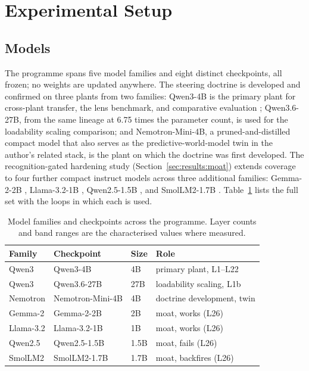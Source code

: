 \section{Experimental Setup}
\label{sec:setup}

\subsection{Models}

The programme spans five model families and eight distinct checkpoints, all frozen; no weights are updated anywhere. The steering doctrine is developed and confirmed on three plants from two families: Qwen3-4B is the primary plant for cross-plant transfer, the lens benchmark, and comparative evaluation \cite{Qwen3_2025}; Qwen3.6-27B, from the same lineage at 6.75 times the parameter count, is used for the loadability scaling comparison; and Nemotron-Mini-4B, a pruned-and-distilled compact model \cite{Minitron2024} that also serves as the predictive-world-model twin in the author's related stack, is the plant on which the doctrine was first developed. The recognition-gated hardening study (Section~\ref{sec:results:moat}) extends coverage to four further compact instruct models across three additional families: Gemma-2-2B \cite{Gemma2_2024}, Llama-3.2-1B \cite{Llama3_2024}, Qwen2.5-1.5B \cite{Qwen25_2024}, and SmolLM2-1.7B \cite{SmolLM2_2025}. Table~\ref{tab:models} lists the full set with the loops in which each is used.

\begin{table}[t]
\caption{Model families and checkpoints across the programme. Layer counts and band ranges are the characterised values where measured.}
\label{tab:models}
\vskip 0.1in
\centering
{\footnotesize
\begin{tabular}{llll}
\toprule
\textbf{Family} & \textbf{Checkpoint} & \textbf{Size} & \textbf{Role} \\
\midrule
Qwen3     & Qwen3-4B          & 4B   & primary plant, L1--L22 \\
Qwen3     & Qwen3.6-27B       & 27B  & loadability scaling, L1b \\
Nemotron  & Nemotron-Mini-4B  & 4B   & doctrine development, twin \\
Gemma-2   & Gemma-2-2B        & 2B   & moat, works (L26) \\
Llama-3.2 & Llama-3.2-1B      & 1B   & moat, works (L26) \\
Qwen2.5   & Qwen2.5-1.5B      & 1.5B & moat, fails (L26) \\
SmolLM2   & SmolLM2-1.7B      & 1.7B & moat, backfires (L26) \\
\bottomrule
\end{tabular}}
\end{table}

